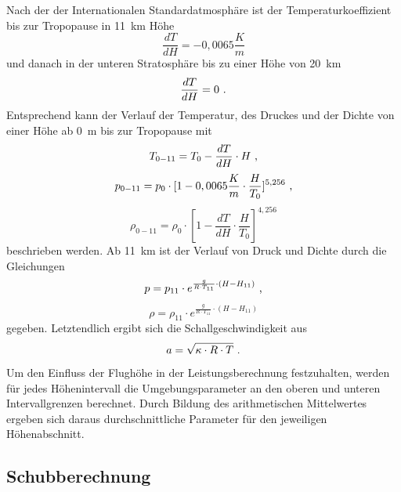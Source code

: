 Nach der der Internationalen Standardatmosphäre ist der Temperaturkoeffizient bis zur Tropopause in \SI{11}{km} Höhe
\begin{equation}
	\frac{dT}{dH} = -0,0065\frac{K}{m}
\end{equation}
und danach in der unteren Stratosphäre bis zu einer Höhe von \SI{20}{km}
\begin{equation}
	\frac{dT}{dH} = 0 ~\text{.}
\end{equation}
Entsprechend kann der Verlauf der Temperatur, des Druckes und der Dichte von einer Höhe ab \SI{0}{m} bis zur Tropopause mit
\begin{equation}
	T_{0-11} = T_0 - \frac{dT}{dH}\cdot H ~\text{,}
\end{equation}
\begin{equation}
	p_{0-11} = p_0\cdot [1-0,0065\frac{K}{m}\cdot \frac{H}{T_0}]^{5,256} ~\text{,}
	\label{eq:rho_0_11}
\end{equation}
\begin{equation}
	\rho_{0-11} = \rho_0 \cdot [1-\frac{dT}{dH}\cdot \frac{H}{T_0}]^{4,256}
\end{equation}
beschrieben werden. Ab \SI{11}{km} ist der Verlauf von Druck und Dichte durch die Gleichungen
\begin{equation}
	p = p_{11}\cdot e^{\frac{g}{R\cdot T_{11}}\cdot (H-H_{11})} ~\text{,}
	\label{eq:druck_strato}
\end{equation} 
\begin{equation}
	\rho = \rho_{11}\cdot e^{\frac{g}{R\cdot T_{11}}\cdot (H-H_{11})}
	\label{eq:dichte_strato}
\end{equation}
gegeben.
Letztendlich ergibt sich die Schallgeschwindigkeit aus 
\begin{equation}
	a = \sqrt{\kappa\cdot R\cdot T} ~\text{.}
\end{equation}
Um den Einfluss der Flughöhe in der Leistungsberechnung festzuhalten, werden für jedes Höhenintervall die Umgebungsparameter an den oberen und unteren Intervallgrenzen berechnet. Durch Bildung des arithmetischen Mittelwertes ergeben sich daraus durchschnittliche Parameter für den jeweiligen Höhenabschnitt.  

\subsection{Schubberechnung}

